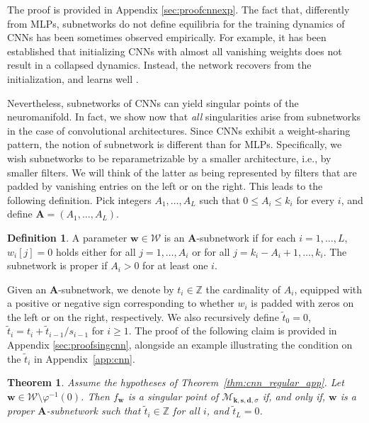 \documentclass{article} %
\theoremstyle{plain}%
\newtheorem{thm}{Theorem}[section]
\theoremstyle{definition}
\newtheorem{defn}{Definition}
\theoremstyle{remark}
\newcommand{\mfldconv}{\mathcal{M}_{\mathbf{k}, \mathbf{s}, \mathbf{d}, \sigma}}
\begin{document}
The proof is provided in  Appendix  \ref{sec:proofcnnexp}. The fact that, differently from MLPs, subnetworks do not define equilibria for the training dynamics of CNNs has been sometimes observed empirically. For example, it has been established that initializing CNNs with almost all vanishing weights does not result in a collapsed dynamics. Instead, the network recovers from the initialization, and learns well \citep{blumenfeld2020beyond}. 



Nevertheless, subnetworks of CNNs can yield singular points of the neuromanifold. In fact, we show now that \emph{all} singularities arise from subnetworks in the case of convolutional architectures. Since CNNs exhibit a weight-sharing pattern, the notion of subnetwork is different than for MLPs. Specifically, we wish subnetworks to be reparametrizable by a smaller architecture, i.e., by smaller filters. We will think of the latter as being represented by filters that are padded by vanishing entries on the left or on the right. This leads to the following definition. Pick integers $A_1, \ldots, A_{L}$ such that $0 \leq A_i \leq k_i$ for every $i$, and define $\mathbf{A} = (A_1, \ldots, A_L)$. 
\begin{defn}\label{def:subnetCNN}
A parameter $\mathbf{w} \in \mathcal{W}$ is an $\mathbf{A}$-subnetwork if for each $i=1, \ldots, L$,  $w_i[j] = 0$ holds either for all $j = 1, \ldots,  A_i$ or for all $j = k_i - A_i+1, \ldots, k_i$. The subnetwork is proper if $A_i > 0$ for at least one $i$.
\end{defn}
Given an $\mathbf{A}$-subnetwork, we denote by $t_i \in \mathbb{Z}$ the cardinality of $A_i$, equipped with a positive or negative sign corresponding to whether $w_i$ is padded with zeros on the left or on the right, respectively. We also recursively define $\tilde{t}_{0} = 0$, $\tilde{t}_i = t_i + \tilde{t}_{i-1} / s_{i-1}$ for $i \geq 1$.  The proof of the following claim is  provided in  Appendix  \ref{sec:proofsingcnn}, alongside an example illustrating the condition on the $\tilde t_i$ in Appendix~\ref{app:cnn}.
\begin{thm}\label{thm:singcnn}
Assume the hypotheses of Theorem~\ref{thm:cnn_regular_app}. Let $\mathbf{w} \in \mathcal{W} \setminus \varphi^{-1}(0)$. Then $f_\mathbf{w}$ is a singular point of $\mfldconv$ if, and only if, $\mathbf{w}$ is a proper $\mathbf{A}$-subnetwork 
such that $\tilde{t}_i \in \mathbb{Z}$ for all $i$, and $\tilde{t}_{L} = 0$. 
\end{thm}
\end{document}
